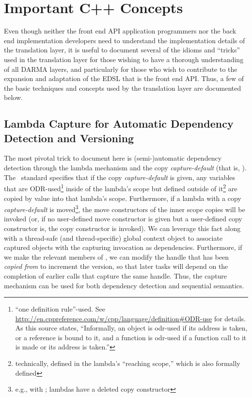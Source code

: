 \section{Important C++ Concepts}
Even though neither the \gls{front end} \gls{API} application programmers nor the \gls{back end}
implementation developers need to understand the implementation details of the
\gls{translation layer}, it is useful to document several of the idioms and ``tricks'' used in the
\gls{translation layer} for those wishing to have a thorough understanding of all
\gls{DARMA} layers, and particularly for those who wish to contribute to the expansion
and adaptation of the \gls{EDSL} that is the \gls{front end} \gls{API}.  Thus, a few of the basic
techniques and concepts used by the translation layer are documented below.

\subsection{Lambda Capture for Automatic Dependency Detection and Versioning}
The most pivotal trick to document here is (semi-)automatic dependency detection
through the  \gls{lambda} mechanism and the copy {\it capture-default} (that is,
\inlinecode{[=]}).  The \CC\ standard specifies that if the copy
{\it capture-default} is given, any variables that are ODR-used\footnote{``one
definition rule''-used.  See
\url{http://en.cppreference.com/w/cpp/language/definition\#ODR-use} for
details.
As this source states, ``Informally, an object is odr-used if its address is
taken, or a reference is bound to it, and a function is odr-used if a function
call to it is made or its address is taken.''}
inside of the \gls{lambda}'s scope but
defined outside of it\footnote{technically, defined in the \gls{lambda}'s
``reaching scope,'' which is also formally defined} are copied by value into
that \gls{lambda}'s scope.  Furthermore, if a \gls{lambda} with a copy {\it capture-default}
is moved\footnote{e.g., with ; \glspl{lambda} have a deleted
copy constructor}, the move constructors of the inner scope copies will be
invoked (or, if no user-defined move constructor is given but a user-defined
copy constructor is, the copy constructor is invoked).  We can leverage this
fact along with a thread-safe (and thread-specific) global context object to
associate captured  objects with the capturing
 invocation as dependencies.  Furthermore, if we
make the relevant members of  ,
we can modify the \gls{handle} that has been {\it copied from} to increment the
version, so that later tasks will depend on the completion of earlier
 calls that \gls{capture} the same \gls{handle}.  Thus, the
\gls{capture} mechanism can be used for both dependency detection and \gls{sequential
semantics}.

